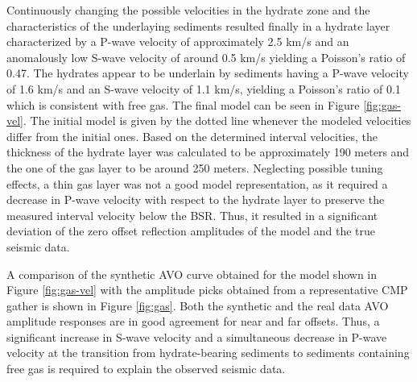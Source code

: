 \par
Continuously changing the possible velocities in the hydrate zone and the 
characteristics of the underlaying sediments resulted finally in a hydrate layer
characterized by a P-wave velocity of approximately 2.5 km/s and an anomalously
low S-wave velocity of around 0.5 km/s yielding a Poisson's ratio of 0.47.
The hydrates appear to be underlain by sediments having a 
P-wave velocity of 1.6 km/s and an S-wave velocity of 1.1 km/s, yielding a
Poisson's ratio of 0.1 which is consistent with free gas. The final model can 
be seen in Figure \ref{fig:gas-vel}. The initial model is given by the dotted line
whenever the modeled velocities differ from the initial ones.
Based on the determined interval velocities,
the thickness of the hydrate layer was calculated to be approximately 190
meters and the one of the gas layer to be around 250 meters. Neglecting possible
tuning effects, a thin gas layer was not a good model representation,
as it required a decrease in P-wave velocity with respect to the hydrate
layer to preserve the measured interval velocity below the BSR. Thus, it
resulted in a significant 
deviation of the zero offset reflection amplitudes of the model
and the true seismic data.
\par
A comparison of the synthetic AVO curve obtained for the model shown in
Figure \ref{fig:gas-vel} with the amplitude picks obtained
from a representative CMP gather is shown in Figure \ref{fig:gas}. Both the
synthetic and the real data AVO amplitude responses are in good agreement
for near and far offsets. Thus, a significant increase in S-wave velocity and
a simultaneous decrease in P-wave velocity at the transition from 
hydrate-bearing sediments to sediments containing free gas is required to
explain the observed seismic data. 







